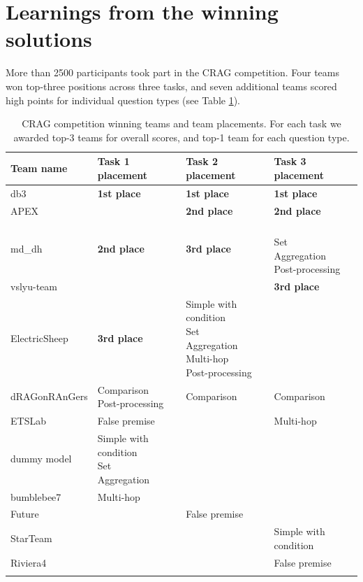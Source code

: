 \section{Learnings from the winning solutions} \label{sec:winning-solutions}

More than 2500 participants took part in the CRAG competition. Four teams won top-three positions across three tasks, and seven additional teams scored high points for individual question types (see Table \ref{tab:winning-teams}). 

\begin{table}[htbp]
\centering
\caption{CRAG competition winning teams and team placements. For each task we awarded top-3 teams for overall scores, and top-1 team for each question type.}
\begin{tabular}{l|lll}
\toprule
\bf Team name & \bf Task 1 placement & \bf Task 2 placement & \bf Task 3 placement \\
\midrule
db3 \cite{db3} & \bf 1st place& \bf 1st place& \bf 1st place\\
\arrayrulecolor[gray]{0.8}  %
\hline
APEX \cite{apex} & & \bf 2nd place& \bf 2nd place\\
\hline
md\_dh \cite{mddh} & \bf 2nd place& \bf 3rd place & \makecell[tl]{\\Set\\Aggregation\\Post-processing} \\
\hline
vslyu-team \cite{vslyu} & & & \bf 3rd place \\
\hline
ElectricSheep \cite{electricsheep} & \bf 3rd place & \makecell[tl]{Simple with condition\\Set\\Aggregation\\Multi-hop\\Post-processing}& \\
\hline
dRAGonRAnGers \cite{dragonrangers} & \makecell[tl]{Comparison\\ Post-processing}& Comparison& Comparison\\
\hline
ETSLab & False premise& & Multi-hop\\
\hline
dummy model \cite{dummy_model} & \makecell[tl]{Simple with condition\\Set\\Aggregation} & & \\
\hline
bumblebee7 \cite{bumblebee7} & Multi-hop& & \\
\hline
Future \cite{future} & & False premise & \\
\hline
StarTeam \cite{starteam}& & & Simple with condition\\
\hline
Riviera4 \cite{riviera4} & & & False premise\\
\arrayrulecolor{black}
\bottomrule
\end{tabular}
\label{tab:winning-teams}
\end{table}

